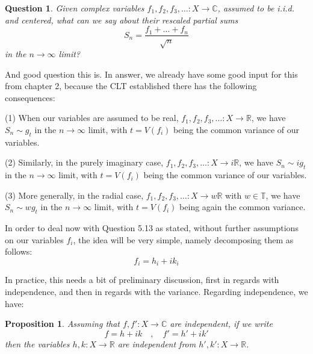 \documentclass[12pt]{amsbook}
\newtheorem{proposition}[theorem]{Proposition}
\newtheorem{question}[theorem]{Question}
\begin{document}
\begin{question}
Given complex variables $f_1,f_2,f_3,\ldots:X\to\mathbb C$, assumed to be i.i.d. and centered, what can we say about their rescaled partial sums
$$S_n=\frac{f_1+\ldots+f_n}{\sqrt{n}}$$
in the $n\to\infty$ limit? 
\end{question}

And good question this is. In answer, we already have some good input for this from chapter 2, because the CLT established there has the following consequences:

\bigskip

(1) When our variables are assumed to be real, $f_1,f_2,f_3,\ldots:X\to\mathbb R$, we have $S_n\sim g_t$ in the $n\to\infty$ limit, with $t=V(f_i)$ being the common variance of our variables. 

\bigskip

(2) Similarly, in the purely imaginary case, $f_1,f_2,f_3,\ldots:X\to i\mathbb R$, we have $S_n\sim ig_t$ in the $n\to\infty$ limit, with $t=V(f_i)$ being the common variance of our variables.

\bigskip

(3) More generally, in the radial case, $f_1,f_2,f_3,\ldots:X\to w\mathbb R$ with $w\in\mathbb T$, we have $S_n\sim wg_t$ in the $n\to\infty$ limit, with $t=V(f_i)$ being again the common variance.

\bigskip

In order to deal now with Question 5.13 as stated, without further assumptions on our variables $f_i$, the idea will be very simple, namely decomposing them as follows:
$$f_i=h_i+ik_i$$

In practice, this needs a bit of preliminary discussion, first in regards with independence, and then in regards with the variance. Regarding independence, we have:

\begin{proposition}
Assuming that $f,f':X\to\mathbb C$ are independent, if we write
$$f=h+ik\quad,\quad f'=h'+ik'$$
then the variables $h,k:X\to\mathbb R$ are independent from $h',k':X\to\mathbb R$.
\end{proposition}
\end{document}

